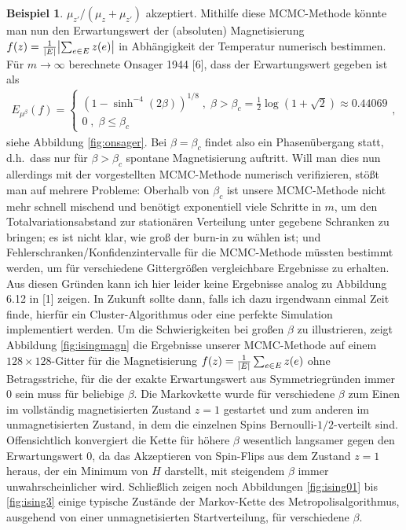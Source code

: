 \documentclass[twoside]{article}
\theoremstyle{definition}
\newtheorem{example}[theorem]{Beispiel}
\begin{document}
\begin{example}
$\mu_{z'}/(\mu_z+\mu_{z'})$ akzeptiert. Mithilfe diese MCMC-Methode könnte man nun den Erwartungswert der (absoluten) Magnetisierung $f(z)= \frac{1}{\abs{E}} \abs{\sum_{e \in E} z(e)}$ in Abhängigkeit der Temperatur numerisch bestimmen. Für $m \to \infty$ berechnete Onsager 1944 [6], dass der Erwartungswert gegeben ist als
\begin{align}
E_{\mu^\beta}(f)=
\begin{cases}
(1-\sinh^{-4}(2 \beta))^{1/8} \; , \; \beta > \beta_c = \frac{1}{2} \log(1 + \sqrt{2}) \approx 0.44069\\
0 \; , \; \beta \leq \beta_c
\end{cases},
\end{align} 
siehe Abbildung \ref{fig:onsager}. Bei $\beta = \beta_c$ findet also ein Phasenübergang statt, d.h.\ dass nur für $\beta > \beta_c$ spontane Magnetisierung auftritt. Will man dies nun allerdings mit der vorgestellten MCMC-Methode numerisch verifizieren, stößt man auf mehrere Probleme: Oberhalb von $\beta_c$ ist unsere MCMC-Methode nicht mehr schnell mischend und benötigt exponentiell viele Schritte in $m$, um den Totalvariationsabstand zur stationären Verteilung unter gegebene Schranken zu bringen; es ist nicht klar, wie groß der burn-in zu wählen ist; und Fehlerschranken/Konfidenzintervalle für die MCMC-Methode müssten bestimmt werden, um für verschiedene Gittergrößen vergleichbare Ergebnisse zu erhalten. Aus diesen Gründen kann ich hier leider keine Ergebnisse analog zu Abbildung 6.12 in [1] zeigen. In Zukunft sollte dann, falls ich dazu irgendwann einmal Zeit finde, hierfür ein Cluster-Algorithmus oder eine perfekte Simulation implementiert werden. Um die Schwierigkeiten bei großen $\beta$ zu illustrieren, zeigt Abbildung \ref{fig:isingmagn} die Ergebnisse unserer MCMC-Methode auf einem $128\times 128$-Gitter für die Magnetisierung $f(z)= \frac{1}{\abs{E}} \sum_{e \in E} z(e)$ ohne Betragsstriche, für die der exakte Erwartungswert aus Symmetriegründen immer 0 sein muss für beliebige $\beta$. Die Markovkette wurde für verschiedene $\beta$ zum Einen im vollständig magnetisierten Zustand $z=1$ gestartet und zum anderen im unmagnetisierten Zustand, in dem die einzelnen Spins Bernoulli-$1/2$-verteilt sind. Offensichtlich konvergiert die Kette für höhere $\beta$ wesentlich langsamer gegen den Erwartungswert 0, da das Akzeptieren von Spin-Flips aus dem Zustand $z=1$ heraus, der ein Minimum von $H$ darstellt, mit steigendem $\beta$ immer unwahrscheinlicher wird. Schließlich zeigen noch Abbildungen \ref{fig:ising01} bis \ref{fig:ising3} einige typische Zustände der Markov-Kette des Metropolisalgorithmus, ausgehend von einer unmagnetisierten Startverteilung, für verschiedene $\beta.$
\end{example}
\end{document}
